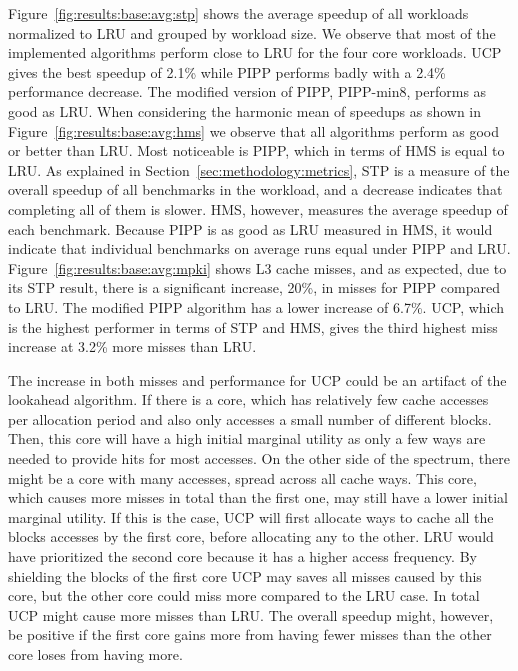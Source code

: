 Figure~\ref{fig:results:base:avg:stp} shows the average speedup of all workloads normalized to LRU and grouped by workload size.
We observe that most of the implemented algorithms perform close to LRU for the four core workloads.
UCP gives the best speedup of 2.1\% while PIPP performs badly with a 2.4\% performance decrease. 
The modified version of PIPP, PIPP-min8, performs as good as LRU.
When considering the harmonic mean of speedups as shown in Figure~\ref{fig:results:base:avg:hms} we observe that all algorithms perform as good or better than LRU.  
Most noticeable is PIPP, which in terms of HMS is equal to LRU.
As explained in Section~\ref{sec:methodology:metrics}, STP is a measure of the overall speedup of all benchmarks in the workload, and a decrease indicates that completing all of them is slower.
HMS, however, measures the average speedup of each benchmark.
Because PIPP is as good as LRU measured in HMS, it would indicate that individual benchmarks on average runs equal under PIPP and LRU.
Figure~\ref{fig:results:base:avg:mpki} shows L3 cache misses, and as expected, due to its STP result, there is a significant increase, 20\%, in misses for PIPP compared to LRU.
The modified PIPP algorithm has a lower increase of 6.7\%.
UCP, which is the highest performer in terms of STP and HMS, gives the third highest miss increase at 3.2\% more misses than LRU. 

The increase in both misses and performance for UCP could be an artifact of the lookahead algorithm.
If there is a core, which has relatively few cache accesses per allocation period and also only accesses a small number of different blocks.
Then, this core will have a high initial marginal utility as only a few ways are needed to provide hits for most accesses.
On the other side of the spectrum, there might be a core with many accesses, spread across all cache ways.
This core, which causes more misses in total than the first one, may still have a lower initial marginal utility.
If this is the case, UCP will first allocate ways to cache all the blocks accesses by the first core, before allocating any to the other.
LRU would have prioritized the second core because it has a higher access frequency.
By shielding the blocks of the first core UCP may saves all misses caused by this core, but the other core could miss more compared to the LRU case.
In total UCP might cause more misses than LRU.
The overall speedup might, however, be positive if the first core gains more from having fewer misses than the other core loses from having more.

